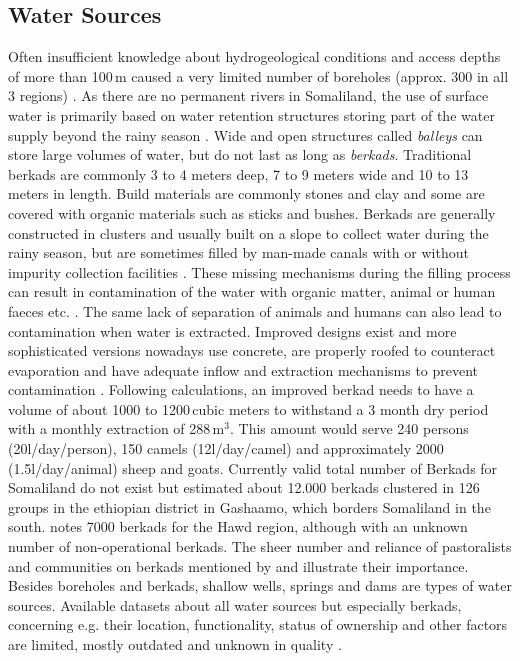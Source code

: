 {\subsection{Water Sources}

Often insufficient knowledge about hydrogeological conditions and access depths of more than 100\,m caused a very limited number of boreholes (approx. 300 in all 3 regions) \autocite{faoswalimHydrogeologicalSurveyAssessment2012, petrucciLandscapeLandformsNorthern2022,salemTerritorialDiagnosticReport2016}. As there are no permanent rivers in Somaliland, the use of surface water is primarily based on water retention structures storing part of the water supply beyond the rainy season \autocite{petrucciLandscapeLandformsNorthern2022}. Wide and open structures called \textit{balleys} can store large volumes of water, but do not last as long as \textit{berkads}.
Traditional berkads are commonly 3 to 4 meters deep, 7 to 9 meters wide and 10 to 13 meters in length. Build materials are commonly stones and clay and some are covered with organic materials such as sticks and bushes. Berkads are generally constructed in clusters and usually built on a slope to collect water during the rainy season, but are sometimes filled by man-made canals with or without impurity collection facilities \autocite{walkerChangingPastoralismEthiopian1998}. These missing mechanisms during the filling process can result in contamination of the water with organic matter, animal or human faeces etc. \autocite{mercycorpsIMPROVEDBERKADDESIGNS2017}. The same lack of separation of animals and humans can also lead to contamination when water is extracted. Improved designs exist and more sophisticated versions nowadays use concrete, are properly roofed to counteract evaporation and have adequate inflow and extraction mechanisms to prevent contamination \autocite{mercycorpsIMPROVEDBERKADDESIGNS2017, petrucciLandscapeLandformsNorthern2022}. Following \autocite{mercycorpsIMPROVEDBERKADDESIGNS2017} calculations, an improved berkad needs to have a volume of about 1000 to 1200\,cubic meters to  withstand a 3 month dry period with a monthly extraction of 288\,m$^3$. This amount would serve 240 persons (20l/day/person), 150 camels (12l/day/camel) and approximately 2000 (1.5l/day/animal) sheep and goats. Currently valid total number of Berkads for Somaliland do not exist but \autocite{walkerChangingPastoralismEthiopian1998} estimated about 12.000 berkads clustered in 126 groups in the ethiopian district in Gashaamo, which borders Somaliland in the south. \autocite{birchWeUsedSing2008} notes 7000 berkads for the Hawd region, although with an unknown number of non-operational berkads. The sheer number and reliance of pastoralists and communities on berkads mentioned by \autocite{walkerChangingPastoralismEthiopian1998} and \autocite{birchSomalilandSomaliRegion2008} illustrate their importance. Besides boreholes and berkads, shallow wells, springs and dams are types of water sources.  
Available datasets about all water sources but especially berkads, concerning e.g. their location, functionality, status of ownership and other factors are limited, mostly outdated and unknown in quality \autocite{FAOSWALIMSomalia}. 

}
